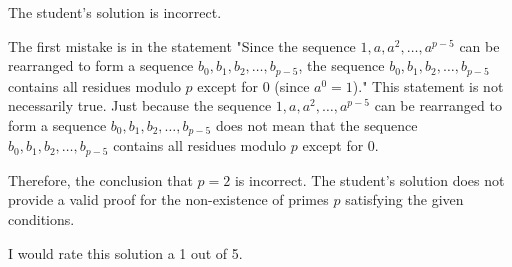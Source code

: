 The student's solution is incorrect.

The first mistake is in the statement "Since the sequence \( 1,a,a^2,\dots,a^{p-5} \) can be rearranged to form a sequence \( b_0,b_1,b_2,\dots,b_{p-5} \), the sequence \( b_0,b_1,b_2,\dots,b_{p-5} \) contains all residues modulo \( p \) except for \( 0 \) (since \( a^0 = 1 \))." This statement is not necessarily true. Just because the sequence \( 1,a,a^2,\dots,a^{p-5} \) can be rearranged to form a sequence \( b_0,b_1,b_2,\dots,b_{p-5} \) does not mean that the sequence \( b_0,b_1,b_2,\dots,b_{p-5} \) contains all residues modulo \( p \) except for \( 0 \).

Therefore, the conclusion that \( p = 2 \) is incorrect. The student's solution does not provide a valid proof for the non-existence of primes \( p \) satisfying the given conditions.

I would rate this solution a 1 out of 5.
